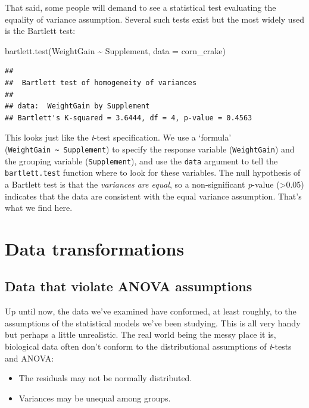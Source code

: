 \documentclass[
]{book}
\newenvironment{Shaded}{\begin{snugshade}}{\end{snugshade}}
\newcommand{\AttributeTok}[1]{\textcolor[rgb]{0.77,0.63,0.00}{#1}}
\newcommand{\FunctionTok}[1]{\textcolor[rgb]{0.00,0.00,0.00}{#1}}
\newcommand{\NormalTok}[1]{#1}
\newcommand{\SpecialCharTok}[1]{\textcolor[rgb]{0.00,0.00,0.00}{#1}}
\providecommand{\tightlist}{%
  \setlength{\itemsep}{0pt}\setlength{\parskip}{0pt}}
\begin{document}
That said, some people will demand to see a statistical test evaluating the equality of variance assumption. Several such tests exist but the most widely used is the Bartlett test:

\begin{Shaded}
\begin{Highlighting}[]
\FunctionTok{bartlett.test}\NormalTok{(WeightGain }\SpecialCharTok{\textasciitilde{}}\NormalTok{ Supplement, }\AttributeTok{data =}\NormalTok{ corn\_crake)}
\end{Highlighting}
\end{Shaded}

\begin{verbatim}
## 
##  Bartlett test of homogeneity of variances
## 
## data:  WeightGain by Supplement
## Bartlett's K-squared = 3.6444, df = 4, p-value = 0.4563
\end{verbatim}

This looks just like the \emph{t}-test specification. We use a `formula' (\texttt{WeightGain\ \textasciitilde{}\ Supplement}) to specify the response variable (\texttt{WeightGain}) and the grouping variable (\texttt{Supplement}), and use the \texttt{data} argument to tell the \texttt{bartlett.test} function where to look for these variables. The null hypothesis of a Bartlett test is that the \emph{variances are equal}, so a non-significant \emph{p}-value (\textgreater0.05) indicates that the data are consistent with the equal variance assumption. That's what we find here.

\hypertarget{transformations-chapter}{%
\chapter{Data transformations}\label{transformations-chapter}}

\hypertarget{transforms-introduction}{%
\section{Data that violate ANOVA assumptions}\label{transforms-introduction}}

Up until now, the data we've examined have conformed, at least roughly, to the assumptions of the statistical models we've been studying. This is all very handy but perhaps a little unrealistic. The real world being the messy place it is, biological data often don't conform to the distributional assumptions of \emph{t}-tests and ANOVA:

\begin{itemize}
\tightlist
\item
  The residuals may not be normally distributed.
\item
  Variances may be unequal among groups.
\end{itemize}
\end{document}
